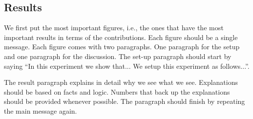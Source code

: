 \subsection{Results}

We first put the most important figures, i.e., the
ones that have the most important results in terms
of the contributions. Each figure should be a
single message. Each figure comes with two
paragraphs. One paragraph for the setup and one
paragraph for the discussion. The set-up paragraph
should start by saying ``In this experiment we
show that... We setup this experiment as follows...''.

The result paragraph explains in detail why we see
what we see. Explanations should be based on facts
and logic. Numbers that back up the explanations
should be provided whenever possible. The
paragraph should finish by repeating the main
message again.
